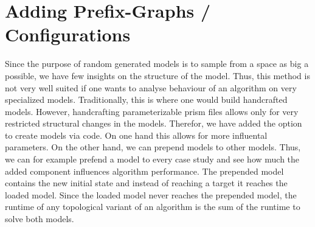 \section{Adding Prefix-Graphs / Configurations}
Since the purpose of random generated models is to sample from a space as big a possible, we have few insights on the structure of the model.
Thus, this method is not very well suited if one wants to analyse behaviour of an algorithm on very specialized models. 
Traditionally, this is where one would build handcrafted models. 
However, handcrafting parameterizable prism files allows only for very restricted structural changes in the models. 
Therefor, we have added the option to create models via code. On one hand this allows for more influental parameters.
On the other hand, we can prepend models to other models. 
Thus, we can for example prefend a model to every case study and see how much the added component influences algorithm performance.
The prepended model contains the new initial state and instead of reaching a target it reaches the loaded model.
Since the loaded model never reaches the prepended model, the runtime of any topological variant of an algorithm is the sum of the runtime to solve both models.



